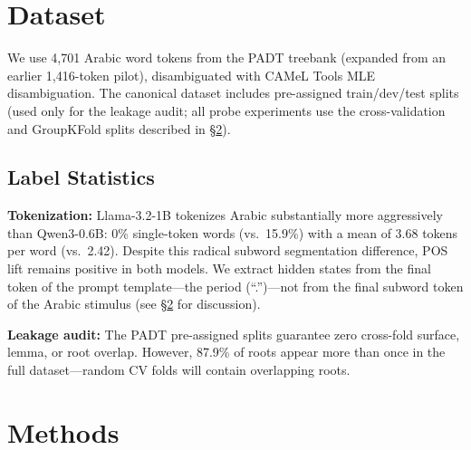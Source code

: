 \documentclass[11pt,a4paper]{article}
\begin{document}
\section{Dataset}

We use 4,701 Arabic word tokens from the PADT treebank (expanded from an earlier 1,416-token pilot), disambiguated with CAMeL Tools MLE disambiguation. The canonical dataset includes pre-assigned train/dev/test splits (used only for the leakage audit; all probe experiments use the cross-validation and GroupKFold splits described in \S\ref{sec:methods}).

\subsection{Label Statistics}

\begin{table}
\centering\small
\caption{Label statistics (min\_examples\_per\_label=3).}

\end{table}

\textbf{Tokenization:} Llama-3.2-1B tokenizes Arabic substantially more aggressively than Qwen3-0.6B: 0\% single-token words (vs.\ 15.9\%) with a mean of 3.68 tokens per word (vs.\ 2.42). Despite this radical subword segmentation difference, POS lift remains positive in both models. We extract hidden states from the final token of the prompt template---the period (``.'')---not from the final subword token of the Arabic stimulus (see \S\ref{sec:methods} for discussion).

\textbf{Leakage audit:} The PADT pre-assigned splits guarantee zero cross-fold surface, lemma, or root overlap. However, 87.9\% of roots appear more than once in the full dataset---random CV folds will contain overlapping roots.

\section{Methods}\label{sec:methods}
\end{document}
